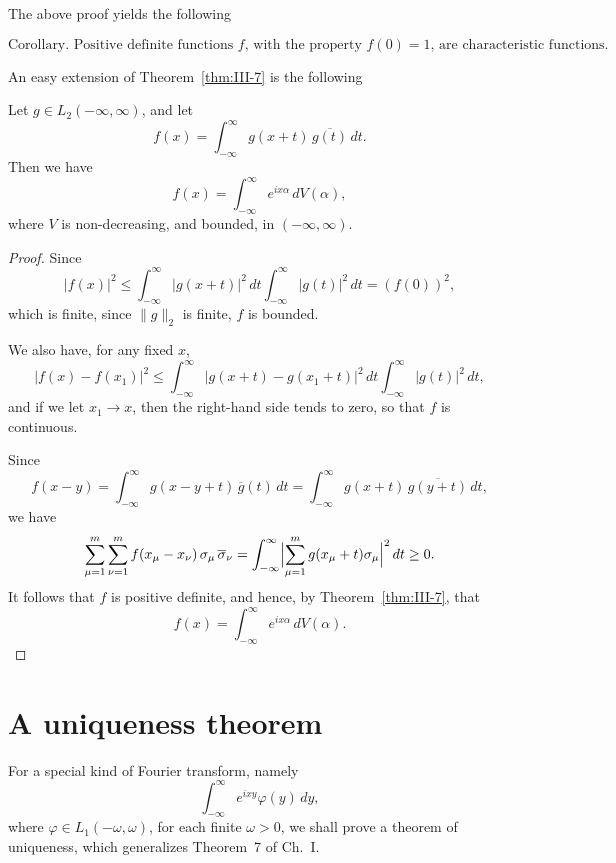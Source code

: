 The above proof yields the following

\begin{equation*}\tag{3.27}\label{eq:III-3.27}
\text{Corollary. Positive definite functions $f$, with the property $f(0)=1$, are characteristic functions.}
\end{equation*}

An easy extension of Theorem~\ref{thm:III-7} is the following

\begin{theorem}[Bochner]\label{thm:III-9}
Let $g\in L_{2}(-\infty,\infty)$, and let
\begin{equation}\tag{3.28}\label{eq:III-3.28}
f(x)=\int_{-\infty}^{\infty}g(x+t)\,\overline{g(t)}\,dt.
\end{equation}
Then we have
\[
f(x)=\int_{-\infty}^{\infty}e^{ix\alpha}\,dV(\alpha),
\]
where $V$ is non-decreasing, and bounded, in $(-\infty,\infty)$.
\end{theorem}

\begin{proof}
Since
\[
|f(x)|^{2}\le\int_{-\infty}^{\infty}|g(x+t)|^{2}\,dt\int_{-\infty}^{\infty}|g(t)|^{2}\,dt=(f(0))^{2},
\]
which is finite, since $\|g\|_{2}$ is finite, $f$ is bounded.

We also have, for any fixed $x$,
\[
|f(x)-f(x_{1})|^{2}\le\int_{-\infty}^{\infty}|g(x+t)-g(x_{1}+t)|^{2}\,dt\int_{-\infty}^{\infty}|g(t)|^{2}\,dt,
\]
and if we let $x_{1}\to x$, then the right-hand side tends to zero, so that $f$ is continuous.

Since
\[
f(x-y)=\int_{-\infty}^{\infty}g(x-y+t)\,\overline{g}(t)\,dt
=\int_{-\infty}^{\infty}g(x+t)\,\overline{g(y+t)}\,dt,
\]
we have
\[
\sum_{\mu=1}^{m}\sum_{\nu=1}^{m}f(x_{\mu}-x_{\nu})\,\sigma_{\mu}\,\overline{\sigma}_{\nu}
=\int_{-\infty}^{\infty}\Bigl|\sum_{\mu=1}^{m}g(x_{\mu}+t)\sigma_{\mu}\Bigr|^{2}\,dt\ge0.
\]
It follows that $f$ is positive definite, and hence, by Theorem~\ref{thm:III-7}, that
\[
f(x)=\int_{-\infty}^{\infty}e^{ix\alpha}\,dV(\alpha).
\]
\end{proof}

\section{A uniqueness theorem}
\label{sec:III-4}

For a special kind of Fourier transform, namely
\[
\int_{-\infty}^{\infty}e^{ixy}\varphi(y)\,dy,
\]
where $\varphi\in L_{1}(-\omega,\omega)$, for each finite $\omega>0$, we shall prove a theorem of uniqueness, which generalizes Theorem~7 of Ch.~I.

